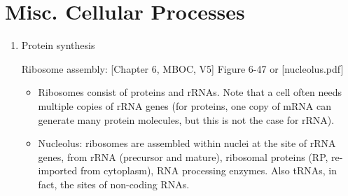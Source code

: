 \documentclass{report}
\begin{document}
\section{Misc. Cellular Processes}
\begin{enumerate}

\item{Protein synthesis} 

Ribosome assembly: [Chapter 6, MBOC, V5] Figure 6-47 or [nucleolus.pdf]
\begin{itemize}
	\item Ribosomes consist of proteins and rRNAs. Note that a cell often needs multiple copies of rRNA genes (for proteins, one copy of mRNA can generate many protein molecules, but this is not the case for rRNA). 
	\item Nucleolus: ribosomes are assembled within nuclei at the site of rRNA genes, from rRNA (precursor and mature), ribosomal proteins (RP, re-imported from cytoplasm), RNA processing enzymes. Also tRNAs, in fact, the sites of non-coding RNAs. 
\end{itemize}


\end{enumerate}
\end{document}
